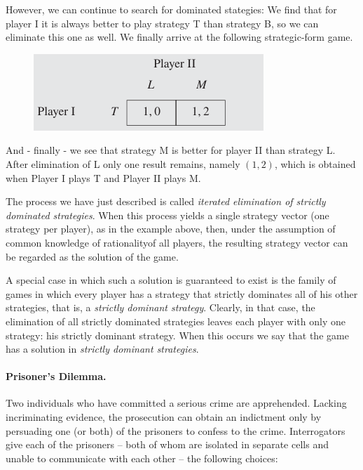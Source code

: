 However, we can continue to search for dominated stategies: We find that for player I it is always better to play strategy T than strategy B, so we can eliminate this one as well. We finally arrive at the following strategic-form game.

\begin{figure}[H]
    \centering
    \includegraphics[scale=0.75]{images/2023-10-10-game_theory_12.png}
\end{figure}

And - finally - we see that strategy M is better for player II than strategy L. After elimination of L only one result remains, namely $(1, 2)$, which is obtained when Player I plays T and Player II plays M.

The process we have just described is called \emph{iterated elimination of strictly dominated strategies}. When this process yields a single strategy vector (one strategy per player), as in the example above, then, under the assumption of common knowledge of rationalityof all players, the resulting strategy vector can be regarded as the solution of the game.

A special case in which such a solution is guaranteed to exist is the family of games in which every player has a strategy that strictly dominates all of his other strategies, that is, a \emph{strictly dominant strategy}. Clearly, in that case, the elimination of all strictly dominated strategies leaves each player with only one strategy: his strictly dominant strategy. When this occurs we say that the game has a solution in \emph{strictly dominant strategies}.

\paragraph{Prisoner's Dilemma.} Two individuals who have committed a serious crime are apprehended. Lacking incriminating evidence, the prosecution can obtain an indictment only by persuading one (or both) of the prisoners to confess to the crime. Interrogators give each of the prisoners – both of whom are isolated in separate cells and unable to communicate with each other – the following choices:

